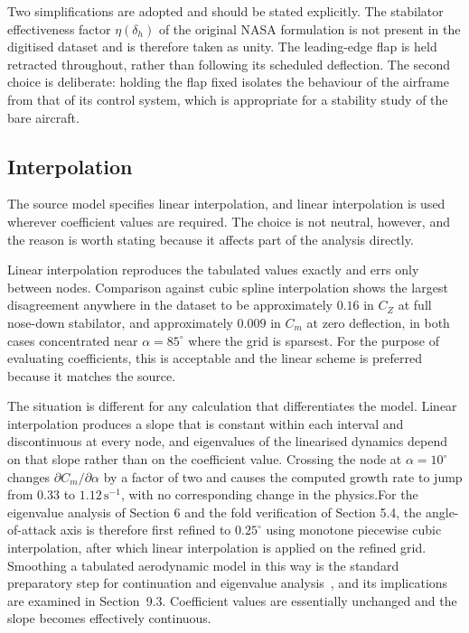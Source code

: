 \documentclass[
bindingoffset=5mm,  %
footnoteindent=3mm, %
hyphenation=true    %
]{src/wut-thesis}
\begin{document}
 Two simplifications are adopted and should be stated explicitly. The
 stabilator effectiveness factor $\eta(\delta_{h})$ of the original NASA
 formulation is not present in the digitised dataset and is therefore taken as
 unity. The leading-edge flap is held retracted throughout, rather than
 following its scheduled deflection. The second choice is deliberate: holding
 the flap fixed isolates the behaviour of the airframe from that of its
 control system, which is appropriate for a stability study of the bare
 aircraft.
 
 \subsection{Interpolation}
 
 The source model specifies linear interpolation, and linear interpolation is
 used wherever coefficient values are required. The choice is not neutral,
 however, and the reason is worth stating because it affects part of the
 analysis directly.
 
 Linear interpolation reproduces the tabulated values exactly and errs only
 between nodes. Comparison against cubic spline interpolation shows the
 largest disagreement anywhere in the dataset to be approximately $0.16$ in
 $C_{Z}$ at full nose-down stabilator, and approximately $0.009$ in $C_{m}$ at
 zero deflection, in both cases concentrated near $\alpha = 85^{\circ}$ where
 the grid is sparsest. For the purpose of evaluating coefficients, this is
 acceptable and the linear scheme is preferred because it matches the source.
 
 The situation is different for any calculation that differentiates the model.
 Linear interpolation produces a slope that is constant within each interval
 and discontinuous at every node, and eigenvalues of the linearised dynamics
 depend on that slope rather than on the coefficient value. Crossing the node
 at $\alpha = 10^{\circ}$ changes $\partial C_{m}/\partial\alpha$ by a factor
 of two and causes the computed growth rate to jump from $0.33$ to
 $1.12\,\mathrm{s^{-1}}$, with no corresponding change in the physics.For the eigenvalue
 analysis of Section 6 and the fold verification of Section 5.4, 
 the angle-of-attack axis is therefore first refined to $0.25^{\circ}$ using
 monotone piecewise cubic interpolation, after which linear interpolation is
 applied on the refined grid. Smoothing a tabulated aerodynamic model in this
 way is the standard preparatory step for continuation and eigenvalue
 analysis~\cite{goman1998}, and its implications are examined in
 Section~9.3. Coefficient values are essentially unchanged and
 the slope becomes effectively continuous.
 
\end{document}
